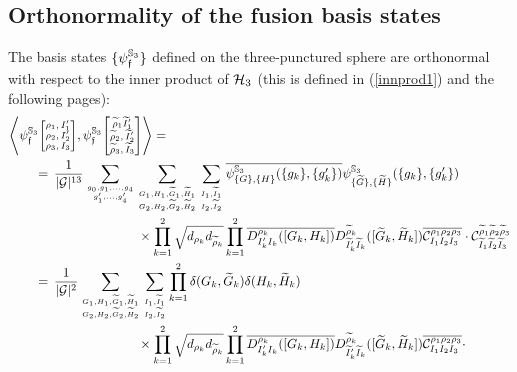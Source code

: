 \documentclass[nofootinbib,superscriptaddress,eqsecnum,tightenlines,11pt]{revtex4-1}
\def\nn{\nonumber}
\def\q{\qquad}
\def\wG{\widetilde{G}}
\def\wH{\widetilde{H}}
\renewcommand{\S}{{\mathbb S}}
\renewcommand{\tilde}{\widetilde}
\begin{document}
\subsection{Orthonormality of the fusion basis states \label{app_orthostates}}
The basis states  $\{\psi^{\S_3}_{\frak f}\}$ defined on the three-punctured sphere are orthonormal with respect to the inner product of ${\cal H}_3$ (this is defined in (\ref{innprod1}) and the  following pages):
\begin{align}\nn
	&\Bigg\langle \psi^{\S_3}_{\mathfrak{f}}
	{ \scriptsize\begin{bmatrix}
		\rho_1,I_1' \\ \rho_2,I_2' \\ \rho_3,I_3
	\end{bmatrix}},
	\psi^{\S_3}_{\mathfrak{f}}
	{ \scriptsize\begin{bmatrix}
		\widetilde{\rho}_1\tilde{I}_1' \\ \widetilde{\rho}_2,\tilde{I}_2' \\ \widetilde{\rho}_3,\tilde{I}_3
	\end{bmatrix}} \Bigg\rangle = \\ \nn 
	&\q = \, \frac{1}{|\mathcal{G}|^{13}}\sum_{{g_0,g_1,\dots,g_4 \atop g_1',\dots,g_4'}}
	\sum_{{G_1,H_1,\widetilde{G}_1,\widetilde{H}_1 \atop G_2,H_2,\widetilde{G}_2,\widetilde{H}_2}}
	\sum_{{I_1,\tilde{I}_1 \atop I_2,\tilde{I}_2}}
	\overline{\psi^{\S_3}_{\{G\},\{H\}}(\{g_k\},\{g_k'\})}
	\psi^{\S_3}_{\{\widetilde{G}\},\{\widetilde{H}\}}(\{g_k\},\{g_k'\}) \\ \nn
	&\q \q \q \q \q   \times \prod_{k=1}^2\sqrt{d_{\rho_k}d_{\widetilde{\rho}_k}}
	\prod_{k=1}^2 \overline{D^{\rho_k}_{I_k'I_k}([G_k,H_k])}D^{\widetilde{\rho}_k}_{\tilde{I}_k'\tilde{I}_k}([\widetilde{G}_k,\widetilde{H}_k])
	\overline{ \mathcal{C}^{\rho_1\rho_2\rho_{3}}_{I_1I_2I_3}}\cdot 
	{\mathcal{C}^{\widetilde{\rho}_1\widetilde{\rho}_2\widetilde{\rho}_{3}}_{\tilde{I}_1\tilde{I}_2\tilde{I}_3}}\\ \nn
	&\q = \, \frac{1}{|\mathcal{G}|^{2}}
	\sum_{{G_1,H_1,\widetilde{G}_1,\widetilde{H}_1 \atop G_2,H_2,\widetilde{G}_2,\widetilde{H}_2}}
	\sum_{{I_1,\tilde{I}_1 \atop I_2,\tilde{I}_2}}
	\prod_{k=1}^2 \delta (G_k, \wG_k)\delta (H_k,\wH_k) \\ \nn
	&\q \q \q \q \q   \times \prod_{k=1}^2\sqrt{d_{\rho_k}d_{\widetilde{\rho}_k}}
	\prod_{k=1}^2 \overline{D^{\rho_k}_{I_k'I_k}([G_k,H_k])}D^{\widetilde{\rho}_k}_{\tilde{I}_k'\tilde{I}_k}([\widetilde{G}_k,\widetilde{H}_k])
	 \overline{\mathcal{C}^{\rho_1\rho_2\rho_{3}}_{I_1I_2I_3}}\cdot 

\end{align}
\end{document}
